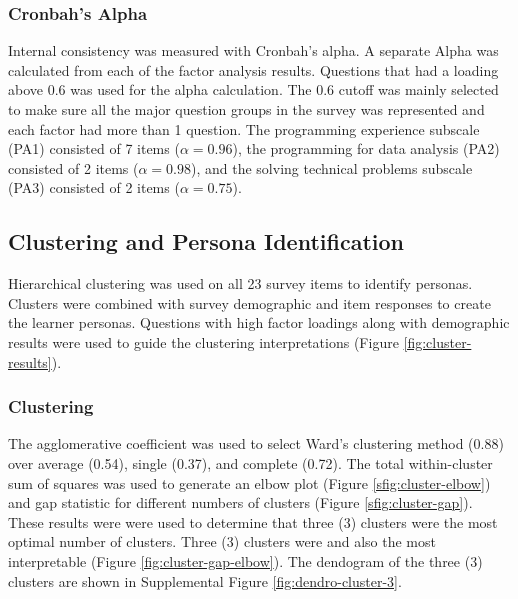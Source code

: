 \documentclass[020-persona\_validation.tex]{subfiles}
\begin{document}
    \subsubsection{Cronbah's Alpha}

        Internal consistency was measured with Cronbah's alpha.
        A separate Alpha was calculated from each of the factor analysis results.
        Questions that had a loading above $0.6$ was used for the alpha calculation.
        The $0.6$ cutoff was mainly selected to make sure all the major question groups in the survey was represented
        and each factor had more than 1 question.
        The programming experience subscale (PA1) consisted of 7 items ($\alpha = 0.96$),
        the programming for data analysis (PA2) consisted of 2 items ($\alpha = 0.98$), and
        the solving technical problems subscale (PA3) consisted of 2 items ($\alpha = 0.75$).

    \subsection{Clustering and Persona Identification}

        Hierarchical clustering was used on all 23 survey items to identify personas.
        Clusters were combined with survey demographic and item responses to create the learner personas.
        Questions with high factor loadings along with demographic results were used to guide the clustering interpretations
        (Figure \ref{fig:cluster-results}).

    \subsubsection{Clustering}

        The agglomerative coefficient was used to select Ward's clustering method (0.88) over
        average (0.54), single (0.37), and complete (0.72).
        The total within-cluster sum of squares was used to generate an elbow plot (Figure \ref{sfig:cluster-elbow})
        and gap statistic for different numbers of clusters (Figure \ref{sfig:cluster-gap}).
        These results were were used to
        determine that three (3) clusters were the most optimal number of clusters.
        Three (3) clusters were and also the most interpretable
        (Figure \ref{fig:cluster-gap-elbow}).
        The dendogram of the three (3) clusters are shown in
        Supplemental Figure \ref{fig:dendro-cluster-3}.
\end{document}
